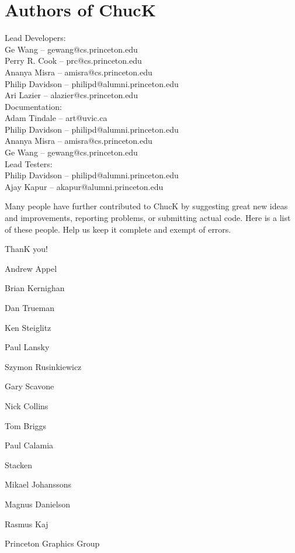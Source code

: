 \newpage
\section{Authors of ChucK}




Lead Developers:\\
\authtab Ge Wang -- gewang@cs.princeton.edu\\
\authtab Perry R. Cook -- prc@cs.princeton.edu\\
\authtab Ananya Misra -- amisra@cs.princeton.edu\\
\authtab Philip Davidson -- philipd@alumni.princeton.edu\\
\authtab Ari Lazier -- alazier@cs.princeton.edu\\


Documentation:\\
\authtab Adam Tindale -- art@uvic.ca\\
\authtab Philip Davidson -- philipd@alumni.princeton.edu\\
\authtab Ananya Misra -- amisra@cs.princeton.edu\\
\authtab Ge Wang -- gewang@cs.princeton.edu\\

Lead Testers:\\
\authtab Philip Davidson -- philipd@alumni.princeton.edu\\
\authtab Ajay Kapur -- akapur@alumni.princeton.edu


Many people have further contributed to ChucK by suggesting great new 
ideas and improvements, reporting problems, or submitting actual code. 
Here is a list of these people.  Help us keep it complete and exempt of 
errors.  

ThanK you!

\begin{chuckitemize}
\item Andrew Appel 
\item Brian Kernighan 
\item Dan Trueman 
\item Ken Steiglitz 
\item Paul Lansky 
\item Szymon Rusinkiewicz 
\item Gary Scavone 
\item Nick Collins 
\item Tom Briggs 
\item Paul Calamia 
\item Stacken 
  \begin{chuckitemize}
  \item Mikael Johanssons 
  \item Magnus Danielson 
  \item Rasmus Kaj 
  \end{chuckitemize}
\item Princeton Graphics Group
\end{chuckitemize}